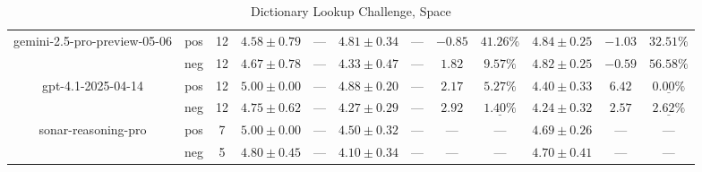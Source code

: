 \begin{table}[ht!]
{\begin{tabular}{| c || c | c || c | c || c | c | c | c || c | c | c ||}
      gemini-2.5-pro-preview-05-06
        & pos
        & 12
        & $4.58 \pm 0.79$
        & $\text{---}$
        & $4.81 \pm 0.34$
        & $\text{---}$
        & $-0.85$
        & $41.26\text{\%}$
        & $4.84 \pm 0.25$
        & $-1.03$
        & $32.51\text{\%}$ \\
        & neg
        & 12
        & $4.67 \pm 0.78$
        & $\text{---}$
        & $4.33 \pm 0.47$
        & $\text{---}$
        & $1.82$
        & $9.57\text{\%}$
        & $4.82 \pm 0.25$
        & $-0.59$
        & $56.58\text{\%}$ \\
    \hline


      gpt-4.1-2025-04-14
        & pos
        & 12
        & $5.00 \pm 0.00$
        & $\text{---}$
        & $4.88 \pm 0.20$
        & $\text{---}$
        & $2.17$
        & $5.27\text{\%}$
        & $4.40 \pm 0.33$
        & $6.42$
        & $\underline{\mathbf{0.00\%}}$ \\
        & neg
        & 12
        & $4.75 \pm 0.62$
        & $\text{---}$
        & $4.27 \pm 0.29$
        & $\text{---}$
        & $2.92$
        & $\underline{\mathbf{1.40\%}}$
        & $4.24 \pm 0.32$
        & $2.57$
        & $\underline{\mathbf{2.62\%}}$ \\
    \hline


      sonar-reasoning-pro
        & pos
        & 7
        & $5.00 \pm 0.00$
        & $\text{---}$
        & $4.50 \pm 0.32$
        & $\text{---}$
        & $\text{---}$
        & $\text{---}$
        & $4.69 \pm 0.26$
        & $\text{---}$
        & $\text{---}$ \\
        & neg
        & 5
        & $4.80 \pm 0.45$
        & $\text{---}$
        & $4.10 \pm 0.34$
        & $\text{---}$
        & $\text{---}$
        & $\text{---}$
        & $4.70 \pm 0.41$
        & $\text{---}$
        & $\text{---}$ \\
    \hline


      \hline
    \end{tabular}
  }
  \caption{Dictionary Lookup Challenge, Space}
  \label{tbleval-dictionary-space_score}
\end{table}


